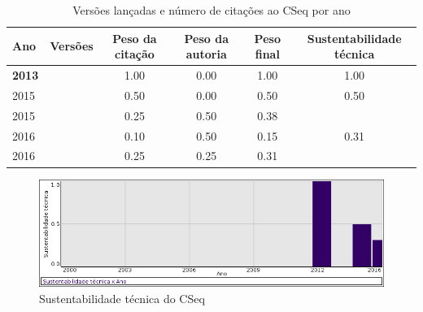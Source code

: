 \begin{table}[H]
\caption{Versões lançadas e número de citações ao CSeq por ano}
\centering
\begin{tabular}{| l | c | c | c | c | c |}
  \hline
  Ano & Versões & Peso da citação & Peso da autoria & Peso final & Sustentabilidade técnica \\
  \hline
            {\bf 2013}
          &
          
          &
          1.00
          &
          0.00
          &
          1.00
          &
            {\color{blue} 1.00}
          \\
\hline
            2015
          &
          
          &
          0.50
          &
          0.00
          &
          0.50
          &
            {\color{blue} 0.50}
          \\
            2015
          &
          
          &
          0.25
          &
          0.50
          &
          0.38
          &
          \\
\hline
            2016
          &
          
          &
          0.10
          &
          0.50
          &
          0.15
          &
            {\color{red} 0.31}
          \\
            2016
          &
          
          &
          0.25
          &
          0.25
          &
          0.31
          &
          \\
\hline
\end{tabular}
\end{table}

\begin{figure}[h]
  \center
  \includegraphics[scale=0.50]{imagens/softwares-charts/cseq.png}
  \caption{Sustentabilidade técnica do CSeq}
\end{figure}


